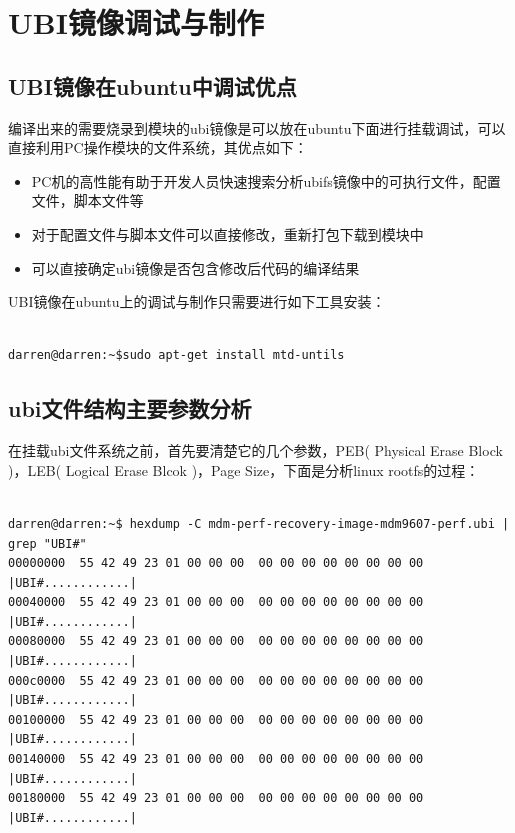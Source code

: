 \chapter{UBI镜像调试与制作}
\section{UBI镜像在ubuntu中调试优点}
编译出来的需要烧录到模块的ubi镜像是可以放在ubuntu下面进行挂载调试，可以直接利用PC操作模块的文件系统，其优点如下：
\begin{itemize}
  \item PC机的高性能有助于开发人员快速搜索分析ubifs镜像中的可执行文件，配置文件，脚本文件等
  \item 对于配置文件与脚本文件可以直接修改，重新打包下载到模块中
  \item 可以直接确定ubi镜像是否包含修改后代码的编译结果
\end{itemize}
UBI镜像在ubuntu上的调试与制作只需要进行如下工具安装：

\begin{mdframed}[backgroundcolor=lightgray,hidealllines=true]
\begin{verbatim}

darren@darren:~$sudo apt-get install mtd-untils

\end{verbatim}
\end{mdframed}

\section{ubi文件结构主要参数分析}
在挂载ubi文件系统之前，首先要清楚它的几个参数，PEB( Physical Erase Block )，LEB( Logical Erase Blcok )，Page Size，下面是分析linux rootfs的过程：
\begin{mdframed}[backgroundcolor=lightgray,hidealllines=true]
\begin{verbatim}

darren@darren:~$ hexdump -C mdm-perf-recovery-image-mdm9607-perf.ubi | grep "UBI#"
00000000  55 42 49 23 01 00 00 00  00 00 00 00 00 00 00 00  |UBI#............|
00040000  55 42 49 23 01 00 00 00  00 00 00 00 00 00 00 00  |UBI#............|
00080000  55 42 49 23 01 00 00 00  00 00 00 00 00 00 00 00  |UBI#............|
000c0000  55 42 49 23 01 00 00 00  00 00 00 00 00 00 00 00  |UBI#............|
00100000  55 42 49 23 01 00 00 00  00 00 00 00 00 00 00 00  |UBI#............|
00140000  55 42 49 23 01 00 00 00  00 00 00 00 00 00 00 00  |UBI#............|
00180000  55 42 49 23 01 00 00 00  00 00 00 00 00 00 00 00  |UBI#............|

\end{verbatim}
\end{mdframed}

